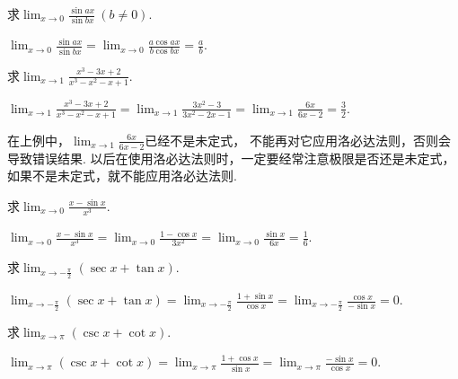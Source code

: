 \begin{example}
求\(\lim_{x\to0} \frac{\sin ax}{\sin bx}\ (b \neq 0)\).
\begin{solution}
\(\lim_{x\to0} \frac{\sin ax}{\sin bx}
= \lim_{x\to0} \frac{a \cos ax}{b \cos bx}
= \frac{a}{b}\).
\end{solution}
\end{example}

\begin{example}
求\(\lim_{x\to1} \frac{x^3-3x+2}{x^3-x^2-x+1}\).
\begin{solution}
\(\lim_{x\to1} \frac{x^3-3x+2}{x^3-x^2-x+1}
= \lim_{x\to1} \frac{3x^2-3}{3x^2-2x-1}
= \lim_{x\to1} \frac{6x}{6x-2}
= \frac32\).
\end{solution}
\end{example}

\begin{remark}
在上例中，\(\lim_{x\to1} \frac{6x}{6x-2}\)已经不是未定式，
不能再对它应用洛必达法则，否则会导致错误结果.
以后在使用洛必达法则时，一定要经常注意极限是否还是未定式，
如果不是未定式，就不能应用洛必达法则.
\end{remark}

\begin{example}
求\(\lim_{x\to0} \frac{x-\sin x}{x^3}\).
\begin{solution}
\(\lim_{x\to0} \frac{x-\sin x}{x^3}
= \lim_{x\to0} \frac{1-\cos x}{3x^2}
= \lim_{x\to0} \frac{\sin x}{6x}
= \frac16\).
\end{solution}
\end{example}

\begin{example}
求\(\lim_{x\to-\frac\pi2} (\sec x+\tan x)\).
\begin{solution}
\(\lim_{x\to-\frac\pi2} (\sec x+\tan x)
= \lim_{x\to-\frac\pi2} \frac{1+\sin x}{\cos x}
= \lim_{x\to-\frac\pi2} \frac{\cos x}{-\sin x}
= 0\).
\end{solution}
\end{example}

\begin{example}
求\(\lim_{x\to\pi} (\csc x+\cot x)\).
\begin{solution}
\(\lim_{x\to\pi} (\csc x+\cot x)
= \lim_{x\to\pi} \frac{1+\cos x}{\sin x}
= \lim_{x\to\pi} \frac{-\sin x}{\cos x}
= 0\).
\end{solution}
\end{example}

